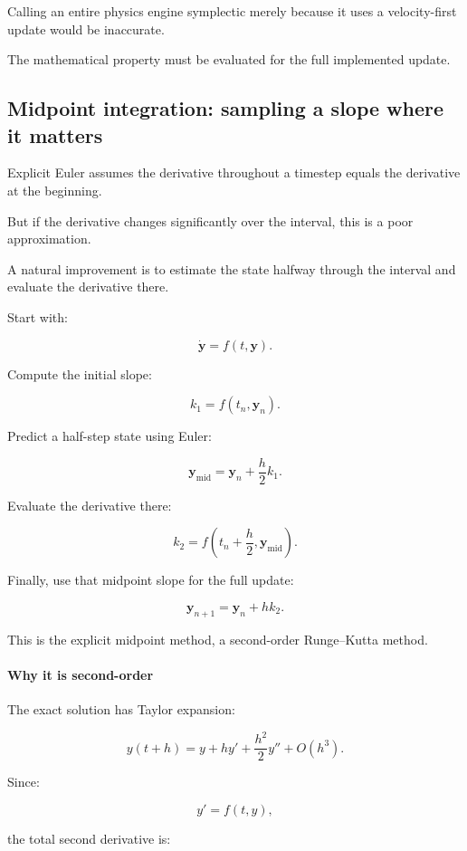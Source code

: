 Calling an entire physics engine symplectic merely because it uses a velocity-first update would be inaccurate.

The mathematical property must be evaluated for the full implemented update.

\subsection{Midpoint integration: sampling a slope where it matters}\label{02-foundations-ii-ch025-midpoint-integration-sampling-a-slope-where-it-matters}

Explicit Euler assumes the derivative throughout a timestep equals the derivative at the beginning.

But if the derivative changes significantly over the interval, this is a poor approximation.

A natural improvement is to estimate the state halfway through the interval and evaluate the derivative there.

Start with:

\[
\dot{\mathbf y}=f(t,\mathbf y).
\]

Compute the initial slope:

\[
k_1=f(t_n,\mathbf y_n).
\]

Predict a half-step state using Euler:

\[
\mathbf y_{\mathrm{mid}} = \mathbf y_n+\frac h2k_1.
\]

Evaluate the derivative there:

\[
k_2=f\left(t_n+\frac h2,\mathbf y_{\mathrm{mid}}\right).
\]

Finally, use that midpoint slope for the full update:

\[
\boxed{ \mathbf y_{n+1}=\mathbf y_n+hk_2 }.
\]

This is the explicit midpoint method, a second-order Runge--Kutta method.

\paragraph{Why it is second-order}\label{02-foundations-ii-ch025-why-it-is-second-order}

The exact solution has Taylor expansion:

\[
y(t+h) = y+hy'+\frac{h^2}{2}y''+O(h^3).
\]

Since:

\[
y'=f(t,y),
\]

the total second derivative is:

